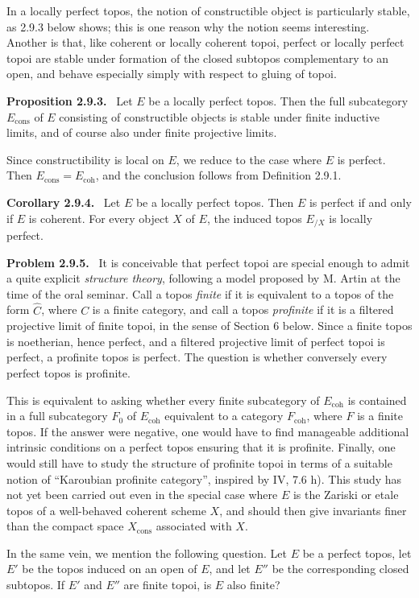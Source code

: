 \documentclass[11pt]{article}
\newcommand{\coh}{\mathrm{coh}}
\newcommand{\cons}{\mathrm{cons}}
\newenvironment{statement}[1]{\par\medskip\noindent\textbf{#1.}\ }{\par\medskip}
\newenvironment{remarktext}[1]{\par\medskip\noindent\textbf{#1.}\ }{\par\medskip}
\begin{document}
In a locally perfect topos, the notion of constructible object is particularly stable, as 2.9.3 below shows; this is one reason why the notion seems interesting. Another is that, like coherent or locally coherent topoi, perfect or locally perfect topoi are stable under formation of the closed subtopos complementary to an open, and behave especially simply with respect to gluing of topoi.

\begin{statement}{Proposition 2.9.3}
Let \(E\) be a locally perfect topos. Then the full subcategory \(E_{\cons}\) of \(E\) consisting of constructible objects is stable under finite inductive limits, and of course also under finite projective limits.
\end{statement}

Since constructibility is local on \(E\), we reduce to the case where \(E\) is perfect. Then \(E_{\cons}=E_{\coh}\), and the conclusion follows from Definition 2.9.1.

\begin{statement}{Corollary 2.9.4}
Let \(E\) be a locally perfect topos. Then \(E\) is perfect if and only if \(E\) is coherent. For every object \(X\) of \(E\), the induced topos \(E_{/X}\) is locally perfect.
\end{statement}

\begin{remarktext}{Problem 2.9.5}
It is conceivable that perfect topoi are special enough to admit a quite explicit \emph{structure theory}, following a model proposed by M. Artin at the time of the oral seminar. Call a topos \emph{finite} if it is equivalent to a topos of the form \(\widehat C\), where \(C\) is a finite category, and call a topos \emph{profinite} if it is a filtered projective limit of finite topoi, in the sense of Section 6 below. Since a finite topos is noetherian, hence perfect, and a filtered projective limit of perfect topoi is perfect, a profinite topos is perfect. The question is whether conversely every perfect topos is profinite.

This is equivalent to asking whether every finite subcategory of \(E_{\coh}\) is contained in a full subcategory \(F_0\) of \(E_{\coh}\) equivalent to a category \(F_{\coh}\), where \(F\) is a finite topos. If the answer were negative, one would have to find manageable additional intrinsic conditions on a perfect topos ensuring that it is profinite. Finally, one would still have to study the structure of profinite topoi in terms of a suitable notion of ``Karoubian profinite category'', inspired by IV, 7.6 h). This study has not yet been carried out even in the special case where \(E\) is the Zariski or etale topos of a well-behaved coherent scheme \(X\), and should then give invariants finer than the compact space \(X_{\cons}\) associated with \(X\).

In the same vein, we mention the following question. Let \(E\) be a perfect topos, let \(E'\) be the topos induced on an open of \(E\), and let \(E''\) be the corresponding closed subtopos. If \(E'\) and \(E''\) are finite topoi, is \(E\) also finite?
\end{remarktext}
\end{document}
